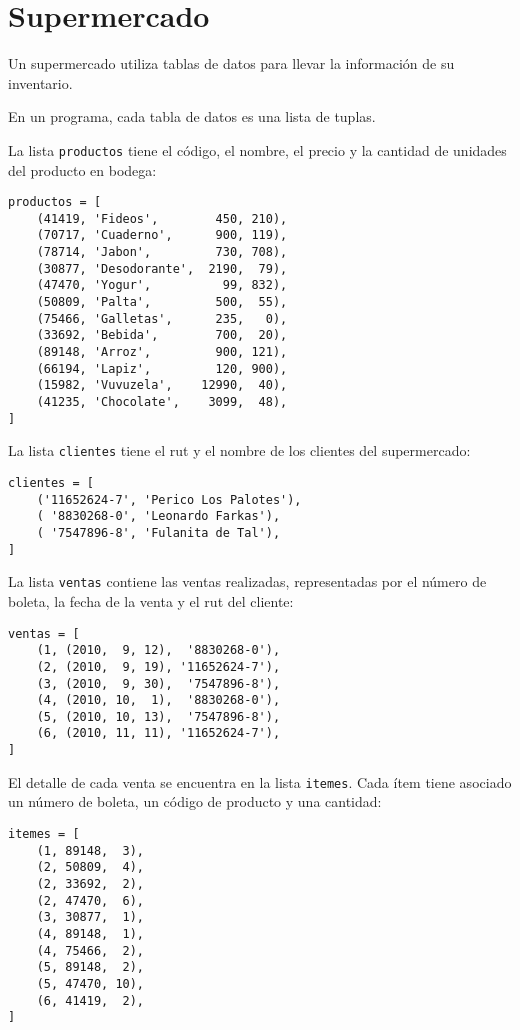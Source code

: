 \section{Supermercado}

Un supermercado utiliza tablas de datos para llevar la información de su
inventario.

En un programa, cada tabla de datos es una lista de tuplas.

La lista \lstinline!productos! tiene el código, el nombre, el precio y
la cantidad de unidades del producto en bodega:

\begin{lstlisting}
productos = [
    (41419, 'Fideos',        450, 210),
    (70717, 'Cuaderno',      900, 119),
    (78714, 'Jabon',         730, 708),
    (30877, 'Desodorante',  2190,  79),
    (47470, 'Yogur',          99, 832),
    (50809, 'Palta',         500,  55),
    (75466, 'Galletas',      235,   0),
    (33692, 'Bebida',        700,  20),
    (89148, 'Arroz',         900, 121),
    (66194, 'Lapiz',         120, 900),
    (15982, 'Vuvuzela',    12990,  40),
    (41235, 'Chocolate',    3099,  48),
]
\end{lstlisting}

La lista \lstinline!clientes! tiene el rut y el nombre de los clientes
del supermercado:

\begin{lstlisting}
clientes = [
    ('11652624-7', 'Perico Los Palotes'),
    ( '8830268-0', 'Leonardo Farkas'),
    ( '7547896-8', 'Fulanita de Tal'),
]
\end{lstlisting}

La lista \lstinline!ventas! contiene las ventas realizadas,
representadas por el número de boleta, la fecha de la venta y el rut del
cliente:

\begin{lstlisting}
ventas = [
    (1, (2010,  9, 12),  '8830268-0'),
    (2, (2010,  9, 19), '11652624-7'),
    (3, (2010,  9, 30),  '7547896-8'),
    (4, (2010, 10,  1),  '8830268-0'),
    (5, (2010, 10, 13),  '7547896-8'),
    (6, (2010, 11, 11), '11652624-7'),
]
\end{lstlisting}

El detalle de cada venta se encuentra en la lista \lstinline!itemes!.
Cada ítem tiene asociado un número de boleta, un código de producto y
una cantidad:

\begin{lstlisting}
itemes = [
    (1, 89148,  3),
    (2, 50809,  4),
    (2, 33692,  2),
    (2, 47470,  6),
    (3, 30877,  1),
    (4, 89148,  1),
    (4, 75466,  2),
    (5, 89148,  2),
    (5, 47470, 10),
    (6, 41419,  2),
]
\end{lstlisting}

